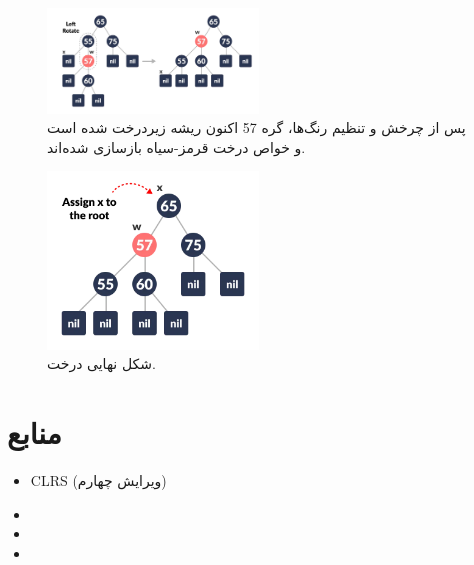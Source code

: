 \documentclass[a4paper,12pt]{article}
\begin{document}
	\begin{figure}[H]
		\centering
		\includegraphics[width=0.5\textwidth]{img/advancedDelFix/delete-12-red-black.png} %
		\caption{پس از چرخش و تنظیم رنگ‌ها، گره 57 اکنون ریشه زیردرخت شده است و خواص درخت قرمز-سیاه بازسازی شده‌اند.}
	\end{figure}
	
	\begin{figure}[H]
		\centering
		\includegraphics[width=0.5\textwidth]{img/advancedDelFix/delete-13-red-black.png} %
		\caption{شکل نهایی درخت.}
	\end{figure}

	
	\section{منابع}
	\begin{itemize}
		\item CLRS (ویرایش چهارم)
		\item {}
		\item {}
		\item {}
	\end{itemize}
	
\end{document}
